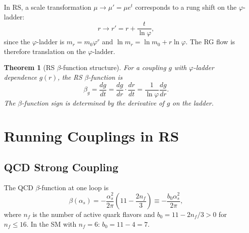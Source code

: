 \documentclass[12pt,a4paper]{article}
\newtheorem{theorem}{Theorem}[section]
\theoremstyle{definition}
\theoremstyle{remark}
\begin{document}
In RS, a scale transformation $\mu \to \mu' = \mu e^t$ corresponds to
a rung shift on the $\varphi$-ladder:
\begin{equation}
  r \to r' = r + \frac{t}{\ln\varphi},
  \label{eq:rung_shift}
\end{equation}
since the $\varphi$-ladder is $m_r = m_0 \varphi^r$ and $\ln m_r = \ln
m_0 + r \ln\varphi$.  The RG flow is therefore translation on the
$\varphi$-ladder.

\begin{theorem}[RS $\beta$-function structure]\label{thm:beta}
For a coupling $g$ with $\varphi$-ladder dependence $g(r)$, the
RS $\beta$-function is
\begin{equation}
  \beta_g = \frac{dg}{dt} = \frac{dg}{dr}\cdot\frac{dr}{dt}
  = \frac{1}{\ln\varphi}\frac{dg}{dr}.
  \label{eq:beta_rs}
\end{equation}
The $\beta$-function sign is determined by the derivative of $g$ on the ladder.
\end{theorem}

\section{Running Couplings in RS}
\label{sec:running}

\subsection{QCD Strong Coupling}

The QCD $\beta$-function at one loop is
\begin{equation}
  \beta(\alpha_s) = -\frac{\alpha_s^2}{2\pi}\left(11 - \frac{2n_f}{3}\right)
  \equiv -\frac{b_0 \alpha_s^2}{2\pi},
  \label{eq:beta_qcd}
\end{equation}
where $n_f$ is the number of active quark flavors and $b_0 = 11 - 2n_f/3 > 0$
for $n_f \leq 16$.  In the SM with $n_f = 6$: $b_0 = 11 - 4 = 7$.
\end{document}
